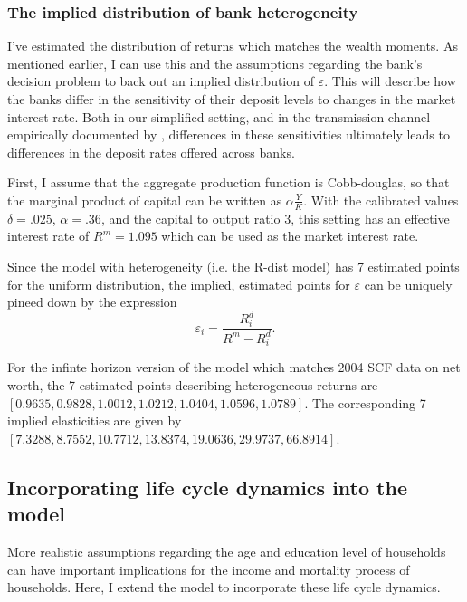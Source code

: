  \subsubsection{The implied distribution of bank heterogeneity}

  \par I've estimated the distribution of returns which matches the wealth moments. As mentioned earlier, I can use this and the assumptions regarding the bank's decision problem to back out an implied distribution of $\varepsilon$. This will describe how the banks differ in the sensitivity of their deposit levels to changes in the market interest rate. Both in our simplified setting, and in the transmission channel empirically documented by \cite{Drechsler2017}, differences in these sensitivities ultimately leads to differences in the deposit rates offered across banks.  

  \par First, I assume that the aggregate production function is Cobb-douglas, so that the marginal product of capital can be written as $\alpha \frac{Y}{K}$. With the calibrated values  $\delta = .025$, $\alpha = .36$, and the capital to output ratio $3$, this setting has an effective interest rate of $R^m = 1.095$ which can be used as the market interest rate.

  \par Since the model with heterogeneity (i.e. the R-dist model) has 7 estimated points for the uniform distribution, the implied, estimated points for $\varepsilon$ can be uniquely pineed down by the expression $$\varepsilon_i = \frac{R_i^d}{R^m - R_i^d} .$$

  \par For the infinte horizon version of the model which matches 2004 SCF data on net worth, the 7 estimated points describing heterogeneous returns are $[0.9635, 0.9828, 1.0012, 1.0212, 1.0404, 1.0596, 1.0789]$. The corresponding 7 implied elasticities are given by $[7.3288, 8.7552, 10.7712, 13.8374, 19.0636, 29.9737, 66.8914]$.

 
\subsection{Incorporating life cycle dynamics into the model}

\par More realistic assumptions regarding the age and education level of households can have important implications for the income and mortality process of households. Here, I extend the model to incorporate these life cycle dynamics.

